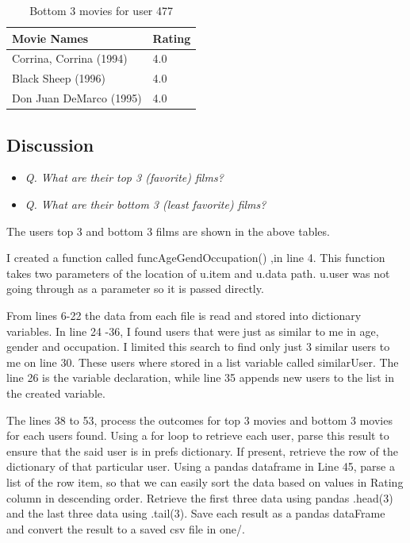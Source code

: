 \documentclass[12pt]{article}
\begin{document}
\begin{table}[ht]
\centering
\caption{Bottom 3 movies for user 477}
\label{tb6}
\begin{tabular}{|l|l|}
\hline
\textbf{Movie Names} & \textbf{Rating} \\ \hline \hline
Corrina, Corrina (1994) & 4.0   \\ \hline
Black Sheep (1996) & 4.0   \\ \hline
Don Juan DeMarco (1995) & 4.0  \\ \hline
\end{tabular}
\end{table}

\clearpage
\subsection*{Discussion}
\begin{itemize}
        \item \emph{Q. What are their top 3 (favorite) films?}
        \item \emph{Q. What are their bottom 3 (least favorite) films?}
    \end{itemize}
The users top 3 and bottom 3 films are shown in the above tables.

I created a function called funcAgeGendOccupation() ,in line 4. This function takes two parameters of the location of u.item and u.data path. u.user was not going through as a parameter so it is passed directly. 

From lines 6-22  the data from each file is read and stored into dictionary variables. In line 24 -36, I found users that were just as similar to me in age, gender and occupation. I limited this search to find only just 3 similar users to me on line 30. These users where stored in a list variable called similarUser. The line 26 is the variable declaration, while line 35 appends new users to the list in the created variable.

The lines 38 to 53, process the outcomes for top 3 movies and bottom 3 movies for each users found. Using a for loop to retrieve each user, parse this result to ensure that the said user is in prefs dictionary. If present, retrieve the row of the dictionary of that particular user. Using a pandas dataframe in Line 45, parse a list of the row item, so that we can easily sort the data based on values in Rating column in descending order. Retrieve the first three data using pandas .head(3) and the last three data using .tail(3). Save each result as a pandas dataFrame and convert the result to a saved csv file in one/. 
\end{document}
